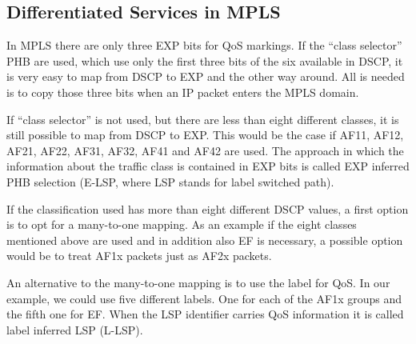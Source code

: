 \subsection{Differentiated Services in MPLS}
In MPLS there are only three EXP bits for QoS markings.
If the ``class selector'' PHB are used, which use only the first three bits of the six available in DSCP, it is very easy to map from DSCP to EXP and the other way around.
All is needed is to copy those three bits when an IP packet enters the MPLS domain.

If ``class selector'' is not used, but there are less than eight different classes, it is still possible to map from DSCP to EXP.
This would be the case if AF11, AF12, AF21, AF22, AF31, AF32, AF41 and AF42 are used.
The approach in which the information about the traffic class is contained in EXP bits is called EXP inferred PHB selection (E-LSP, where LSP stands for label switched path).

If the classification used has more than eight different DSCP values, a first option is to opt for a many-to-one mapping.
As an example if the eight classes mentioned above are used and in addition also EF is necessary, a possible option would be to treat AF1x packets just as AF2x packets.

An alternative to the many-to-one mapping is to use the label for QoS.
In our example, we could use five different labels.
One for each of the AF1x groups and the fifth one for EF.
When the LSP identifier carries QoS information it is called label inferred LSP (L-LSP).


